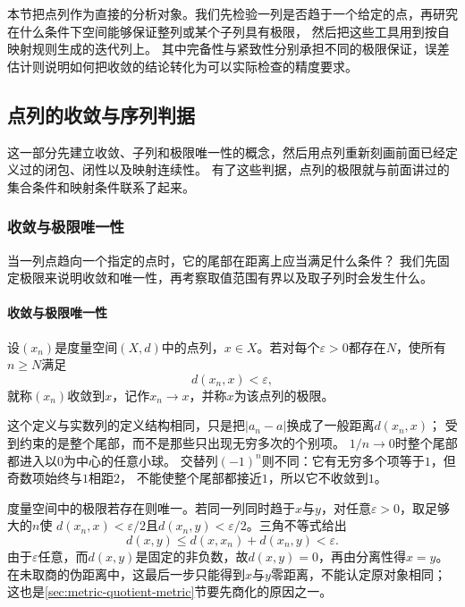 本节把点列作为直接的分析对象。我们先检验一列是否趋于一个给定的点，再研究在什么条件下空间能够保证整列或某个子列具有极限，
然后把这些工具用到按自映射规则生成的迭代列上。
其中完备性与紧致性分别承担不同的极限保证，误差估计则说明如何把收敛的结论转化为可以实际检查的精度要求。

\subsection{点列的收敛与序列判据}
\label{sec:metric-convergent-sequences}

这一部分先建立收敛、子列和极限唯一性的概念，然后用点列重新刻画前面已经定义过的闭包、闭性以及映射连续性。
有了这些判据，点列的极限就与前面讲过的集合条件和映射条件联系了起来。

\subsubsection{收敛与极限唯一性}
\label{sec:metric-convergence-and-uniqueness}

当一列点趋向一个指定的点时，它的尾部在距离上应当满足什么条件？
我们先固定极限来说明收敛和唯一性，再考察取值范围有界以及取子列时会发生什么。

\paragraph{收敛与极限唯一性}

\begin{definition}[点列收敛]
\label{def:metric-convergence}
设$(x_n)$是度量空间$(X,d)$中的点列，$x\in X$。若对每个$\varepsilon>0$都存在$N$，使所有$n\geq N$满足
\[
  d(x_n,x)<\varepsilon,
\]
就称$(x_n)$收敛到$x$，记作$x_n\to x$，并称$x$为该点列的极限。
\end{definition}

这个定义与实数列的定义结构相同，只是把$|a_n-a|$换成了一般距离$d(x_n,x)$；
受到约束的是整个尾部，而不是那些只出现无穷多次的个别项。
$1/n\to0$时整个尾部都进入以$0$为中心的任意小球。
交替列$(-1)^n$则不同：它有无穷多个项等于$1$，但奇数项始终与$1$相距$2$，
不能使整个尾部都接近$1$，所以它不收敛到$1$。

度量空间中的极限若存在则唯一。若同一列同时趋于$x$与$y$，对任意$\varepsilon>0$，取足够大的$n$使
$d(x_n,x)<\varepsilon/2$且$d(x_n,y)<\varepsilon/2$。三角不等式给出
\[
  d(x,y)\leq d(x,x_n)+d(x_n,y)<\varepsilon.
\]
由于$\varepsilon$任意，而$d(x,y)$是固定的非负数，故$d(x,y)=0$，再由分离性得$x=y$。
在未取商的伪距离中，这最后一步只能得到$x$与$y$零距离，不能认定原对象相同；
这也是\ref{sec:metric-quotient-metric}节要先商化的原因之一。

